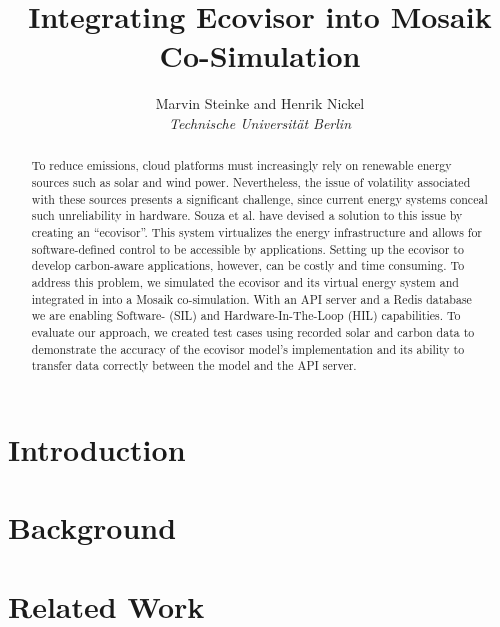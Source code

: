 \documentclass[a4paper, twoside]{IEEEtran}
\begin{document}
\title{Integrating Ecovisor into Mosaik Co-Simulation}
\author{Marvin Steinke and Henrik Nickel\\\textit{Technische Universität Berlin}}

\maketitle

\begin{abstract}

    To reduce emissions, cloud platforms must increasingly rely on renewable
    energy sources such as solar and wind power. Nevertheless, the issue of
    volatility associated with these sources presents a significant challenge,
    since current energy systems conceal such unreliability in hardware. Souza
    et al. have devised a solution to this issue by creating an
    \enquote{ecovisor}. This system virtualizes the energy infrastructure and
    allows for software-defined control to be accessible by applications.
    Setting up the ecovisor to develop carbon-aware applications, however, can
    be costly and time consuming. To address this problem, we simulated the
    ecovisor and its virtual energy system and integrated in into a Mosaik
    co-simulation. With an API server and a Redis database we are enabling
    Software- (SIL) and Hardware-In-The-Loop (HIL) capabilities. To evaluate our
    approach, we created test cases using recorded solar and carbon data to
    demonstrate the accuracy of the ecovisor model's implementation and its
    ability to transfer data correctly between the model and the API server.

\end{abstract}

\section{Introduction}
\label{sec:introduction}


\section{Background}
\label{sec:background}


\section{Related Work}
\label{sec:related_work}

\end{document}
